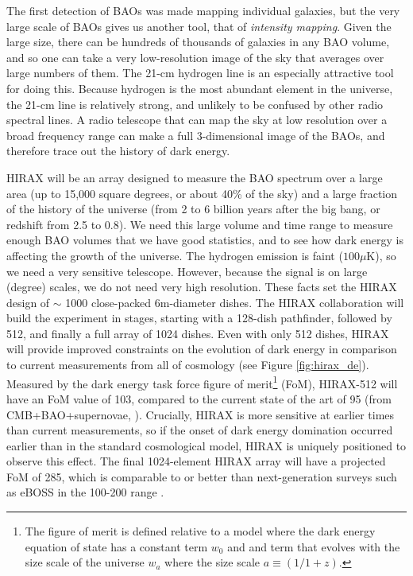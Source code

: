 \documentclass[letterpaper,11pt,preprint]{aastex}
\begin{document}
The first detection of BAOs \citep{Eisenstein05} was made mapping
individual galaxies, but the very large scale of BAOs gives us another
tool, that of {\textit{intensity mapping}}.  Given the large size,
there can be hundreds of thousands of galaxies in any BAO volume, and
so one can take a very low-resolution image of the sky that averages
over large numbers of them.  The 21-cm hydrogen line is an especially
attractive tool for doing this.  Because hydrogen is the most abundant
element in the universe, the 21-cm line is relatively strong, and
unlikely to be confused by other radio spectral lines.  A radio
telescope that can map the sky at low resolution over a broad
frequency range can make a full 3-dimensional image of the BAOs, and
therefore trace out the history of dark energy.

HIRAX will be an array designed to measure the BAO spectrum over a
large area (up to 15,000 square degrees, or about 40\% of the sky) and
a large fraction of the history of the universe (from 2 to 6 billion
years after the big bang, or redshift from 2.5 to 0.8).  We need this
large volume and time range to measure enough BAO volumes that we have
good statistics, and to see how dark energy is affecting the growth of
the universe.  The hydrogen emission is faint ($100 \mu \mathrm{K}$),
so we need a very sensitive telescope.  However, because the signal is
on large (degree) scales, we do not need very high resolution.  These
facts set the HIRAX design of $\sim$ 1000 close-packed 6m-diameter
dishes.  The HIRAX collaboration will build the experiment in stages,
starting with a 128-dish pathfinder, followed by 512, and finally a
full array of 1024 dishes.  Even with only 512 dishes, HIRAX will
provide improved constraints on the evolution of dark energy in
comparison to current measurements from all of cosmology (see Figure
\ref{fig:hirax_de}).  Measured by the dark energy task force figure of
merit\footnote{The figure of merit is defined relative to a model
  where the dark energy equation of state has a constant term $w_0$
  and and term that evolves with the size scale of the universe $w_a$
  where the size scale $a\equiv(1/1+z)$.}  (FoM), HIRAX-512 will have
an FoM value of 103, compared to the current state of the art of 95
(from CMB+BAO+supernovae, \citet{Planck2018Params}).  Crucially, HIRAX
is more sensitive at earlier times than current measurements, so if
the onset of dark energy domination occurred earlier than in the
standard cosmological model, HIRAX is uniquely positioned to observe
this effect.  The final 1024-element HIRAX array will have a projected
FoM of 285, which is comparable to or better than next-generation
surveys such as eBOSS in the 100-200 range \citep{Zhao2016}.
\end{document}
